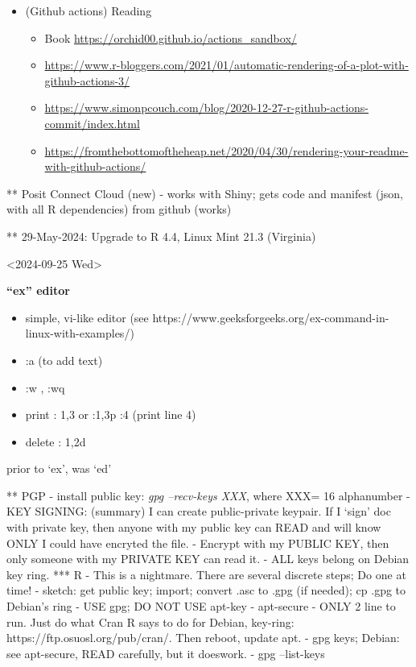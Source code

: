 \documentclass[
]{report}
\providecommand{\tightlist}{%
  \setlength{\itemsep}{0pt}\setlength{\parskip}{0pt}}\usepackage{longtable,booktabs,array}
\begin{document}
\begin{itemize}
\tightlist
\item
  (Github actions) Reading

  \begin{itemize}
  \tightlist
  \item
    Book \url{https://orchid00.github.io/actions_sandbox/}
  \item
    \url{https://www.r-bloggers.com/2021/01/automatic-rendering-of-a-plot-with-github-actions-3/}
  \item
    \url{https://www.simonpcouch.com/blog/2020-12-27-r-github-actions-commit/index.html}
  \item
    \url{https://fromthebottomoftheheap.net/2020/04/30/rendering-your-readme-with-github-actions/}
  \end{itemize}
\end{itemize}

** Posit Connect Cloud (new) - works with Shiny; gets code and manifest
(json, with all R dependencies) from github (works)

** 29-May-2024: Upgrade to R 4.4, Linux Mint 21.3 (Virginia)

\textless2024-09-25 Wed\textgreater{}

\textbf{``ex'' editor}

\begin{itemize}
\tightlist
\item
  simple, vi-like editor (see
  https://www.geeksforgeeks.org/ex-command-in-linux-with-examples/)
\item
  :a (to add text)
\item
  :w , :wq
\item
  print : 1,3 or :1,3p :4 (print line 4)
\item
  delete : 1,2d
\end{itemize}

prior to `ex', was `ed'

** PGP - install public key: \emph{gpg --recv-keys XXX}, where XXX= 16
alphanumber - KEY SIGNING: (summary) I can create public-private
keypair. If I `sign' doc with private key, then anyone with my public
key can READ and will know ONLY I could have encryted the file. -
Encrypt with my PUBLIC KEY, then only someone with my PRIVATE KEY can
read it. - ALL keys belong on Debian key ring. *** R - This is a
nightmare. There are several discrete steps; Do one at time! - sketch:
get public key; import; convert .asc to .gpg (if needed); cp .gpg to
Debian's ring - USE gpg; DO NOT USE apt-key - apt-secure - ONLY 2 line
to run. Just do what Cran R says to do for Debian, key-ring:
https://ftp.osuosl.org/pub/cran/. Then reboot, update apt. - gpg keys;
Debian: see apt-secure, READ carefully, but it doeswork. - gpg
--list-keys
\end{document}
